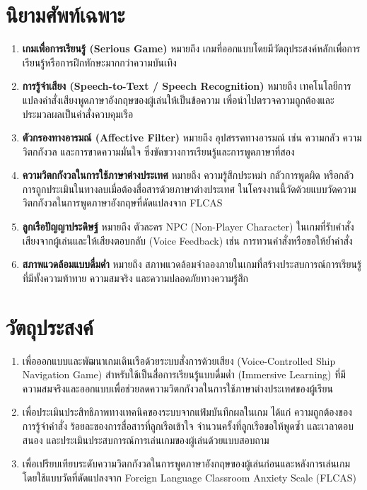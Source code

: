 \section{นิยามศัพท์เฉพาะ}

\begin{enumerate}[label=\arabic*)]
    \item \textbf{เกมเพื่อการเรียนรู้ (Serious Game)} หมายถึง เกมที่ออกแบบโดยมีวัตถุประสงค์หลักเพื่อการเรียนรู้หรือการฝึกทักษะมากกว่าความบันเทิง
    \item \textbf{การรู้จำเสียง (Speech-to-Text / Speech Recognition)} หมายถึง เทคโนโลยีการแปลงคำสั่งเสียงพูดภาษาอังกฤษของผู้เล่นให้เป็นข้อความ เพื่อนำไปตรวจความถูกต้องและประมวลผลเป็นคำสั่งควบคุมเรือ
    \item \textbf{ตัวกรองทางอารมณ์ (Affective Filter)} หมายถึง อุปสรรคทางอารมณ์ เช่น ความกลัว ความวิตกกังวล และการขาดความมั่นใจ ซึ่งขัดขวางการเรียนรู้และการพูดภาษาที่สอง
    \item \textbf{ความวิตกกังวลในการใช้ภาษาต่างประเทศ} หมายถึง ความรู้สึกประหม่า กลัวการพูดผิด หรือกลัวการถูกประเมินในทางลบเมื่อต้องสื่อสารด้วยภาษาต่างประเทศ ในโครงงานนี้วัดด้วยแบบวัดความวิตกกังวลในการพูดภาษาอังกฤษที่ดัดแปลงจาก FLCAS
    \item \textbf{ลูกเรือปัญญาประดิษฐ์} หมายถึง ตัวละคร NPC (Non-Player Character) ในเกมที่รับคำสั่งเสียงจากผู้เล่นและให้เสียงตอบกลับ (Voice Feedback) เช่น การทวนคำสั่งหรือขอให้ย้ำคำสั่ง
    \item \textbf{สภาพแวดล้อมแบบดื่มด่ำ} หมายถึง สภาพแวดล้อมจำลองภายในเกมที่สร้างประสบการณ์การเรียนรู้ที่มีทั้งความท้าทาย ความสมจริง และความปลอดภัยทางความรู้สึก
\end{enumerate}

\section{วัตถุประสงค์}

\begin{enumerate}[label=\arabic*)]
    \item เพื่อออกแบบและพัฒนาเกมเดินเรือด้วยระบบสั่งการด้วยเสียง (Voice-Controlled Ship Navigation Game) สำหรับใช้เป็นสื่อการเรียนรู้แบบดื่มด่ำ (Immersive Learning) ที่มีความสมจริงและออกแบบเพื่อช่วยลดความวิตกกังวลในการใช้ภาษาต่างประเทศของผู้เรียน
    \item เพื่อประเมินประสิทธิภาพทางเทคนิคของระบบจากแฟ้มบันทึกผลในเกม ได้แก่ ความถูกต้องของการรู้จำคำสั่ง ร้อยละของการสื่อสารที่ลูกเรือเข้าใจ จำนวนครั้งที่ลูกเรือขอให้พูดซ้ำ และเวลาตอบสนอง และประเมินประสบการณ์การเล่นเกมของผู้เล่นด้วยแบบสอบถาม
    \item เพื่อเปรียบเทียบระดับความวิตกกังวลในการพูดภาษาอังกฤษของผู้เล่นก่อนและหลังการเล่นเกม โดยใช้แบบวัดที่ดัดแปลงจาก Foreign Language Classroom Anxiety Scale (FLCAS)
\end{enumerate}

